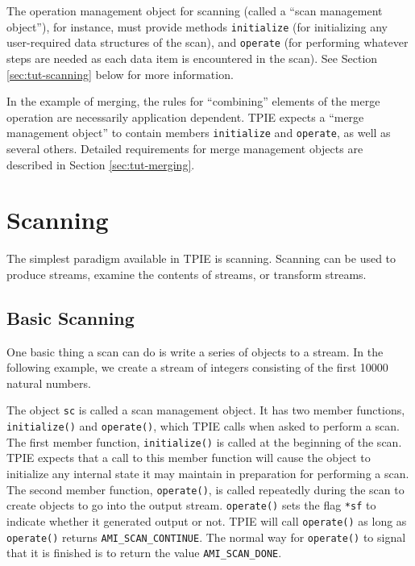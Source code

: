 The operation management object for scanning (called a ``scan
management object''), for
instance, must provide methods \lstinline|initialize| (for
initializing any user-required data structures of the scan), and
\lstinline|operate| (for performing whatever steps are needed as each
data item is encountered in the scan). See Section
\ref{sec:tut-scanning} below for more information.

In the example of merging, the rules for ``combining'' elements of the
merge operation are necessarily application dependent. TPIE expects a
``merge management object''
to contain members \lstinline|initialize| and \lstinline|operate|, as
well as several others. Detailed requirements for merge management
objects are described in Section \ref{sec:tut-merging}.

\section{Scanning}

  The simplest
paradigm available in TPIE is scanning.  Scanning can be used to
produce streams, examine the contents of streams, or transform
streams.

\subsection{Basic Scanning}

One basic thing a scan can do is write a series of objects to a
stream.  In the following example, we create a stream of integers
consisting of the first 10000 natural numbers.



The object \lstinline|sc| is called a scan management
object.  It has two member
functions, \lstinline|initialize()| and \lstinline|operate()|, which
TPIE calls when asked to perform a scan.  The first member function,
\lstinline|initialize()| is called at the beginning of the scan.  TPIE
expects that a call to this member function will cause the object to
initialize any internal state it may maintain in preparation for
performing a scan.  The second member function, \lstinline|operate()|,
is called repeatedly during the scan to create objects to go into the
output stream.  \lstinline|operate()| sets the flag \lstinline|*sf| to
indicate whether it generated output or not.  TPIE will call
\lstinline|operate()| as long as \lstinline|operate()| returns
\lstinline|AMI_SCAN_CONTINUE|. The normal way for
\lstinline|operate()| to signal that it is finished is to return the
value \lstinline|AMI_SCAN_DONE|.

